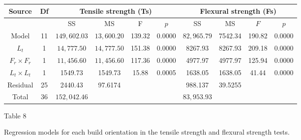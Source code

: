 \documentclass[10pt]{article}
\begin{document}
\begin{center}
\begin{tabular}{|c|c|c|c|c|c|c|c|c|c|}
\hline
\multirow[b]{2}{*}{Source} & \multirow[b]{2}{*}{Df} & \multicolumn{4}{|c|}{Tensile strength (Ts)} & \multicolumn{4}{|c|}{Flexural strength (Fs)} \\
\hline
 &  & SS & MS & F & $p$ & SS & MS & $F$ & $p$ \\
\hline
Model & 11 & $149,602.03$ & $13,600.20$ & 139.32 & 0.0000 & $82,965.79$ & 7542.34 & 190.82 & 0.0000 \\
\hline
$L_{t}$ & 1 & $14,777.50$ & $14,777.50$ & 151.38 & 0.0000 & 8267.93 & 8267.93 & 209.18 & 0.0000 \\
\hline
$F_{r} \times F_{r}$ & 1 & $11,456.60$ & $11,456.60$ & 117.36 & 0.0000 & 4977.97 & 4977.97 & 125.94 & 0.0000 \\
\hline
$L_{t} \times L_{t}$ & 1 & 1549.73 & 1549.73 & 15.88 & 0.0005 & 1638.05 & 1638.05 & 41.44 & 0.0000 \\
\hline
Residual & 25 & 2440.43 & 97.6174 &  &  & 988.137 & 39.5255 &  &  \\
\hline
Total & 36 & $152,042.46$ &  &  &  & $83,953.93$ &  &  &  \\
\hline
\end{tabular}
\end{center}

Table 8

Regression models for each build orientation in the tensile strength and flexural strength tests.
\end{document}
